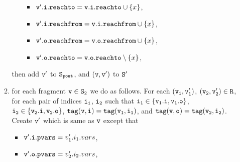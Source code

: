 \begin{itemize}
\begin{enumerate}
\begin{itemize}
\begin{itemize}
\item $\mathtt{v}'.\mathtt{i}.\mathtt{reachto} = \mathtt{v}.\mathtt{i}.\mathtt{reachto} \cup \left\{x\right\}$,
 \item $\mathtt{v}'.\mathtt{i}.\mathtt{reachfrom} = \mathtt{v}.\mathtt{i}.\mathtt{reachfrom} \cup \left\{x\right\}$,
\item $\mathtt{v}'.\mathtt{o}.\mathtt{reachfrom} = \mathtt{v}.\mathtt{o}.\mathtt{reachfrom} \cup \left\{x\right\}$,
\item $\mathtt{v}'.\mathtt{o}.\mathtt{reachto} = \mathtt{v}.\mathtt{o}.\mathtt{reachto} \setminus \left\{x\right\}$,
\end{itemize}
\end{itemize}
then add $\tt v'$ to $\tt S_{post}$, and $\tt (v,v')$ to $\tt S'$
\item for each fragment $\tt v \in S_2$ we do as follows. For each $\tt (v_1,v_1')$, $\tt (v_2,v_2') \in R$, for each pair of indices $\tt i_1$, $\tt i_2$ such that $\tt i_1 \in \{v_1.i, v_1.o\}$, $\tt i_2 \in \{v_2.i, v_2.o\}$, $\tt tag(v,i) = tag(v_1, i_1)$, and $\tt tag(v,o) = tag(v_2, i_2)$. Create $\tt v'$ which is same as $\tt v$ except that 
\begin{itemize}
\item $\mathtt{v}'.\mathtt{i}.\mathtt{pvars} = v_1'.i_1.vars$,
\item $\mathtt{v}'.\mathtt{o}.\mathtt{pvars} = v_2'.i_2.vars$,


\end{itemize}
\end{enumerate}
\end{itemize}
